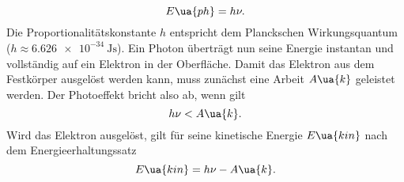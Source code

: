 \begin{equation}
E\ua{ph} = h \nu.
\end{equation}
Die Proportionalitätskonstante $h$ entspricht dem Planckschen Wirkungsquantum ($h \approx \SI{6.626e-34}{\joule\second}$). Ein Photon %
überträgt nun seine Energie instantan und vollständig auf ein Elektron in der Oberfläche. Damit das Elektron
aus dem Festkörper ausgelöst werden kann, muss zunächst eine Arbeit $A\ua{k}$ geleistet werden. Der Photoeffekt bricht
also ab, wenn gilt
\begin{equation}
  h\nu < A\ua{k}.
\end{equation}
Wird das Elektron ausgelöst, gilt für seine kinetische Energie $E\ua{kin}$ nach dem Energieerhaltungssatz
\begin{equation}
  E\ua{kin} = h\nu - A\ua{k}.
\end{equation}
